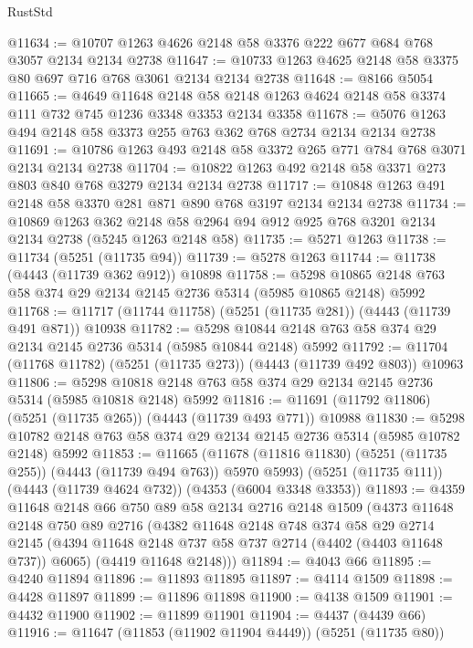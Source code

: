\begin{lexlean}{RustStd}
\begin{coremodule}
@11634 := @10707 @1263 @4626 @2148 @58 @3376 @222 @677 @684 @768 @3057 @2134 @2134 @2738
@11647 := @10733 @1263 @4625 @2148 @58 @3375 @80 @697 @716 @768 @3061 @2134 @2134 @2738
@11648 := @8166 @5054
@11665 := @4649
    @11648
    @2148
    @58
    @2148
    @1263
    @4624
    @2148
    @58
    @3374
    @111
    @732
    @745
    @1236
    @3348
    @3353
    @2134
    @3358
@11678 := @5076 @1263 @494 @2148 @58 @3373 @255 @763 @362 @768 @2734 @2134 @2134 @2738
@11691 := @10786 @1263 @493 @2148 @58 @3372 @265 @771 @784 @768 @3071 @2134 @2134 @2738
@11704 := @10822 @1263 @492 @2148 @58 @3371 @273 @803 @840 @768 @3279 @2134 @2134 @2738
@11717 := @10848 @1263 @491 @2148 @58 @3370 @281 @871 @890 @768 @3197 @2134 @2134 @2738
@11734 := @10869
    @1263
    @362
    @2148
    @58
    @2964
    @94
    @912
    @925
    @768
    @3201
    @2134
    @2134
    @2738
    (@5245 @1263 @2148 @58)
@11735 := @5271 @1263
@11738 := @11734 (@5251 (@11735 @94))
@11739 := @5278 @1263
@11744 := @11738 (@4443 (@11739 @362 @912)) @10898
@11758 := @5298 @10865 @2148 @763 @58 @374 @29 @2134 @2145 @2736 @5314 (@5985 @10865 @2148) @5992
@11768 := @11717 (@11744 @11758) (@5251 (@11735 @281)) (@4443 (@11739 @491 @871)) @10938
@11782 := @5298 @10844 @2148 @763 @58 @374 @29 @2134 @2145 @2736 @5314 (@5985 @10844 @2148) @5992
@11792 := @11704 (@11768 @11782) (@5251 (@11735 @273)) (@4443 (@11739 @492 @803)) @10963
@11806 := @5298 @10818 @2148 @763 @58 @374 @29 @2134 @2145 @2736 @5314 (@5985 @10818 @2148) @5992
@11816 := @11691 (@11792 @11806) (@5251 (@11735 @265)) (@4443 (@11739 @493 @771)) @10988
@11830 := @5298 @10782 @2148 @763 @58 @374 @29 @2134 @2145 @2736 @5314 (@5985 @10782 @2148) @5992
@11853 := @11665
    (@11678 (@11816 @11830) (@5251 (@11735 @255)) (@4443 (@11739 @494 @763)) @5970 @5993)
    (@5251 (@11735 @111))
    (@4443 (@11739 @4624 @732))
    (@4353 (@6004 @3348 @3353))
@11893 := @4359
    @11648
    @2148
    @66
    @750
    @89
    @58
    @2134
    @2716
    @2148
    @1509
    (@4373
      @11648
      @2148
      @750
      @89
      @2716
      (@4382
        @11648
        @2148
        @748
        @374
        @58
        @29
        @2714
        @2145
        (@4394 @11648 @2148 @737 @58 @737 @2714 (@4402 (@4403 @11648 @737)) @6065)
        (@4419 @11648 @2148)))
@11894 := @4043 @66
@11895 := @4240 @11894
@11896 := @11893 @11895
@11897 := @4114 @1509
@11898 := @4428 @11897
@11899 := @11896 @11898
@11900 := @4138 @1509
@11901 := @4432 @11900
@11902 := @11899 @11901
@11904 := @4437 (@4439 @66)
@11916 := @11647
    (@11853 (@11902 @11904 @4449))
    (@5251 (@11735 @80))

\end{coremodule}
\end{lexlean}
